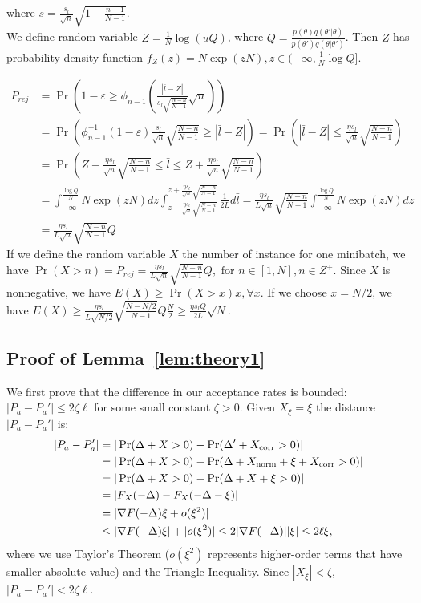 \documentclass{article}
\begin{document}
where $s = \frac{s_l}{\sqrt{n}}\sqrt{1-\frac{n-1}{N-1}}$. \\
We define random variable $Z = \frac{1}{N}\log (uQ)$, where $Q=\frac{p(\theta)q(\theta'|\theta)}{p(\theta')q(\theta|\theta')}$. Then $Z$ has probability density function $f_Z(z) = N \exp(zN), z \in (-\infty, \frac{1}{N} \log Q]$.

\begin{align*} 
P_{rej}&=  \Pr \left( 1-\varepsilon \geq \phi_{n-1} \left( \frac{|\bar{l} - Z|}{s_l \sqrt{\frac{N-n}{N-1}}} \sqrt{n} \right) \right) \\ 
&=  \Pr \left(\phi^{-1}_{n-1} \left (1-\varepsilon \right) \frac{s_l }{\sqrt{n}} \sqrt{\frac{N-n}{N-1}} \geq |\bar{l} -Z| \right) = \Pr \left( |\bar{l} - Z| \leq \frac{\eta s_l}{\sqrt{n}}\sqrt{\frac{N-n}{N-1}} \right) \\
&= \Pr \left(Z - \frac{\eta s_l}{\sqrt{n}}\sqrt{\frac{N-n}{N-1}} \leq \bar{l} \leq Z + \frac{\eta s_l}{\sqrt{n}}\sqrt{\frac{N-n}{N-1}} \right) \\
&= \int_{-\infty} ^{\frac{\log Q}{N}} N \exp (zN)dz \int_{z - \frac{\eta s_l}{\sqrt{n}}\sqrt{\frac{N-n}{N-1}}} ^{z+ \frac{\eta s_l}{\sqrt{n}}\sqrt{\frac{N-n}{N-1}}} \frac{1}{2L} d\bar{l} = \frac{\eta s_l}{L\sqrt{n}}\sqrt{\frac{N-n}{N-1}} \int_{-\infty} ^{\frac{\log Q}{N}} N \exp(zN) dz \\
&= \frac{\eta s_l}{L\sqrt{n}}\sqrt{\frac{N-n}{N-1}} Q
\end{align*}
 If we define the random variable $X$ the number of instance for one minibatch, we have $\Pr (X>n) = P_{rej} = \frac{\eta s_l}{L\sqrt{n}}\sqrt{\frac{N-n}{N-1}} Q, \mbox{ for } n \in [1,N], n \in Z^+$. Since $X$ is nonnegative, we have $E(X) \geq \Pr (X >x)x, \forall x$. If we choose $x=N/2$, we have $E(X) \geq \frac{\eta s_l}{L\sqrt{N/2}}\sqrt{\frac{N-N/2}{N-1}} Q \frac{N}{2} \geq \frac{\eta s_{l}Q}{2L}\sqrt{N}$.

\subsection{Proof of Lemma~\ref{lem:theory1}}\label{app:theory1}

We first prove that the difference in our acceptance rates is bounded: $|P_a - P_a'| \leq 2\zeta
\ell$ for some small constant $\zeta > 0$. Given $X_\xi = \xi$ the distance $|P_a - P_a'|$ is:
\begin{align*}
|P_a - P_a'| &= |\Pr(\Delta + X >0) - \Pr(\Delta' + X_{\rm corr} > 0)|\\
& = | \Pr (\Delta + X > 0) - \Pr (\Delta + X_{\rm norm} + \xi + X_{\rm corr} >0) |    \\
&= |\Pr (\Delta + X > 0) -\Pr(\Delta + X + \xi >0)| \\
&= |F_X(-\Delta)- F_X(-\Delta - \xi)| \\
&= |\nabla F(-\Delta) \xi + o(\xi^2)|\\
&\leq  |\nabla F(-\Delta) \xi| +| o(\xi^2)| \leq 2|\nabla F(-\Delta)| |\xi| \leq 2\ell \xi,
\end{align*}
where we use Taylor's Theorem ($o(\xi^2)$ represents higher-order terms that have smaller absolute
value) and the Triangle Inequality.  Since $|X_\xi| < \zeta$, $|P_a - P_a'| < 2 \zeta \ell$.
\end{document}
